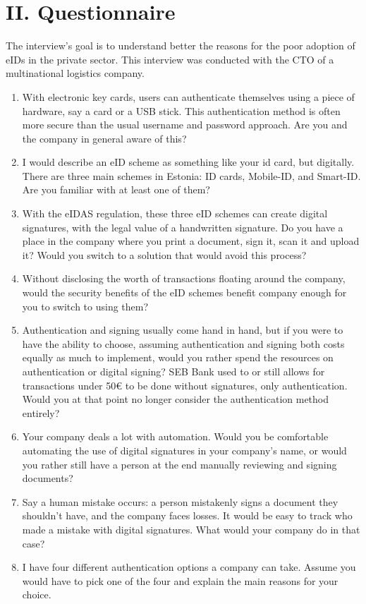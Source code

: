 \section*{II. Questionnaire}

The interview's goal is to understand better the reasons for the poor adoption of eIDs in the private sector. This interview was conducted with the CTO of a multinational logistics company.



\begin{enumerate}
    \item With electronic key cards, users can authenticate themselves using a piece of hardware, say a card or a USB stick. This authentication method is often more secure than the usual username and password approach. Are you and the company in general aware of this?
    \item I would describe an eID scheme as something like your id card, but digitally. There are three main schemes in Estonia: ID cards, Mobile-ID, and Smart-ID. Are you familiar with at least one of them?
    \item With the eIDAS regulation, these three eID schemes can create digital signatures, with the legal value of a handwritten signature. Do you have a place in the company where you print a document, sign it, scan it and upload it? Would you switch to a solution that would avoid this process?
    \item Without disclosing the worth of transactions floating around the company, would the security benefits of the eID schemes benefit company enough for you to switch to using them?
    \item Authentication and signing usually come hand in hand, but if you were to have the ability to choose, assuming authentication and signing both costs equally as much to implement, would you rather spend the resources on authentication or digital signing? SEB Bank used to or still allows for transactions under 50€ to be done without signatures, only authentication. Would you at that point no longer consider the authentication method entirely?
    \item Your company deals a lot with automation. Would you be comfortable automating the use of digital signatures in your company's name, or would you rather still have a person at the end manually reviewing and signing documents?
    \item Say a human mistake occurs: a person mistakenly signs a document they shouldn't have, and the company faces losses. It would be easy to track who made a mistake with digital signatures. What would your company do in that case?
    \item I have four different authentication options a company can take. Assume you would have to pick one of the four and explain the main reasons for your choice.
    

\end{enumerate}
